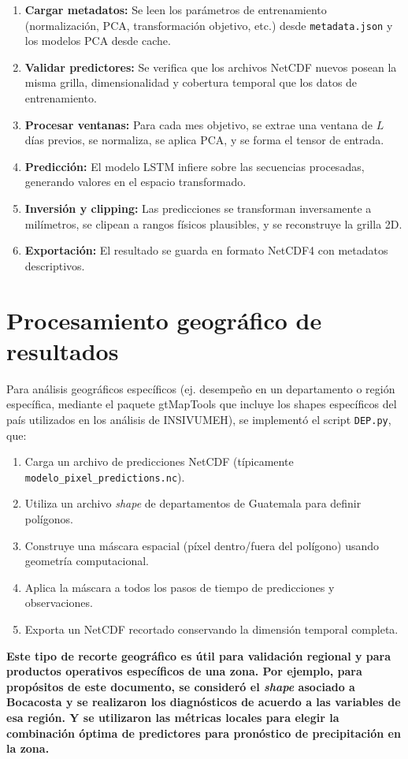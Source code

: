 \begin{enumerate}
    \item \textbf{Cargar metadatos:} Se leen los parámetros de entrenamiento (normalización, PCA, transformación objetivo, etc.) desde \texttt{metadata.json} y los modelos PCA desde cache.
    \item \textbf{Validar predictores:} Se verifica que los archivos NetCDF nuevos posean la misma grilla, dimensionalidad y cobertura temporal que los datos de entrenamiento.
    \item \textbf{Procesar ventanas:} Para cada mes objetivo, se extrae una ventana de $L$ días previos, se normaliza, se aplica PCA, y se forma el tensor de entrada.
    \item \textbf{Predicción:} El modelo LSTM infiere sobre las secuencias procesadas, generando valores en el espacio transformado.
    \item \textbf{Inversión y clipping:} Las predicciones se transforman inversamente a milímetros, se clipean a rangos físicos plausibles, y se reconstruye la grilla 2D.
    \item \textbf{Exportación:} El resultado se guarda en formato NetCDF4 con metadatos descriptivos.
\end{enumerate}

\section{Procesamiento geográfico de resultados}
\label{sec:procesamiento_geografico}

Para análisis geográficos específicos (ej. desempeño en un departamento o región específica, mediante el paquete gtMapTools que incluye los shapes específicos del país utilizados en los análisis de INSIVUMEH), se implementó el script \texttt{DEP.py}, que:
\begin{enumerate}
    \item Carga un archivo de predicciones NetCDF (típicamente \texttt{modelo\_pixel\_predictions.nc}).
    \item Utiliza un archivo \textit{shape} de departamentos de Guatemala para definir polígonos.
    \item Construye una máscara espacial (píxel dentro/fuera del polígono) usando geometría computacional.
    \item Aplica la máscara a todos los pasos de tiempo de predicciones y observaciones.
    \item Exporta un NetCDF recortado conservando la dimensión temporal completa.
\end{enumerate}

\textbf{Este tipo de recorte geográfico es útil para validación regional y para productos operativos específicos de una zona. Por ejemplo, para propósitos de este documento, se consideró el \textit{shape} asociado a Bocacosta y se realizaron los diagnósticos de acuerdo a las variables de esa región. Y se utilizaron las métricas locales para elegir la combinación óptima de predictores para pronóstico de precipitación en la zona. 
}